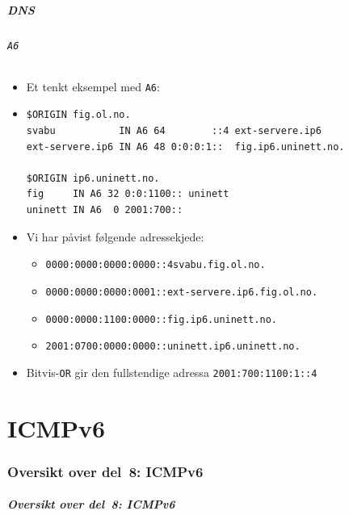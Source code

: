 \begin{frame}[fragile]
  \frametitle{DNS}
  \framesubtitle{\texttt{A6}}
  \begin{itemize}
  \item Et tenkt eksempel med \texttt{A6}:
  \item 
\begin{verbatim}
$ORIGIN fig.ol.no.
svabu           IN A6 64        ::4 ext-servere.ip6
ext-servere.ip6 IN A6 48 0:0:0:1::  fig.ip6.uninett.no.

$ORIGIN ip6.uninett.no.
fig     IN A6 32 0:0:1100:: uninett
uninett IN A6  0 2001:700::
\end{verbatim}
    \item Vi har påvist følgende adressekjede:
      \begin{itemize}
      \item \texttt{0000:0000:0000:0000::\alert{4}}\hfill\texttt{svabu.fig.ol.no.}
      \item \texttt{0000:0000:0000:000\alert{1}::}\hfill\texttt{ext-servere.ip6.fig.ol.no.}
      \item \texttt{0000:0000:\alert{1100}:0000::}\hfill\texttt{fig.ip6.uninett.no.}
      \item \texttt{\alert{2001}:0\alert{700}:0000:0000::}\hfill\texttt{uninett.ip6.uninett.no.}
      \end{itemize}
    \item Bitvis-\texttt{OR} gir den fullstendige adressa \texttt{2001:700:1100:1::4}
  \end{itemize}
\end{frame}

\part{ICMPv6}

\begin{frame}
  \partpage
\end{frame}

\section*{Oversikt over del~8: ICMPv6}
\begin{frame}[allowframebreaks]
  \frametitle{Oversikt over del~8: ICMPv6}
    \tableofcontents
\end{frame}

